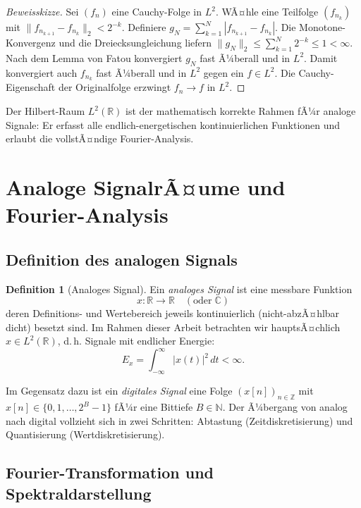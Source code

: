 ﻿\documentclass[a4paper,12pt]{article}
\theoremstyle{definition}
\newtheorem{definition}{Definition}
\begin{document}
\begin{proof}[Beweisskizze]
Sei $(f_n)$ eine Cauchy-Folge in $L^2$.  WÃ¤hle eine Teilfolge $(f_{n_k})$ mit
$\|f_{n_{k+1}} - f_{n_k}\|_2 < 2^{-k}$.  Definiere
$g_N = \sum_{k=1}^N |f_{n_{k+1}} - f_{n_k}|$.
Die Monotone-Konvergenz und die Dreiecksungleichung liefern
$\|g_N\|_2 \leq \sum_{k=1}^N 2^{-k} \leq 1 < \infty$.
Nach dem Lemma von Fatou konvergiert $g_N$ fast Ã¼berall und in $L^2$.
Damit konvergiert auch $f_{n_k}$ fast Ã¼berall und in $L^2$ gegen ein $f \in L^2$.
Die Cauchy-Eigenschaft der Originalfolge erzwingt $f_n \to f$ in $L^2$.
\end{proof}

Der Hilbert-Raum $L^2(\mathbb{R})$ ist der mathematisch korrekte Rahmen fÃ¼r
analoge Signale: Er erfasst alle endlich-energetischen kontinuierlichen Funktionen
und erlaubt die vollstÃ¤ndige Fourier-Analysis.

\section{Analoge SignalrÃ¤ume und Fourier-Analysis}
\label{sec:signale}

\subsection{Definition des analogen Signals}

\begin{definition}[Analoges Signal]
\label{def:analoges_signal}
Ein \emph{analoges Signal} ist eine messbare Funktion
\[
x: \mathbb{R} \to \mathbb{R} \quad (\text{oder} \; \mathbb{C})
\]
deren Definitions- und Wertebereich jeweils kontinuierlich (nicht-abzÃ¤hlbar dicht)
besetzt sind.  Im Rahmen dieser Arbeit betrachten wir hauptsÃ¤chlich
$x \in L^2(\mathbb{R})$, d.\,h. Signale mit endlicher Energie:
\[
E_x = \int_{-\infty}^{\infty} |x(t)|^2 \, dt < \infty.
\]
\end{definition}

Im Gegensatz dazu ist ein \emph{digitales Signal} eine Folge $(x[n])_{n \in \mathbb{Z}}$
mit $x[n] \in \{0,1,\ldots,2^B-1\}$ fÃ¼r eine Bittiefe $B \in \mathbb{N}$.
Der Ã¼bergang von analog nach digital vollzieht sich in zwei Schritten:
Abtastung (Zeitdiskretisierung) und Quantisierung (Wertdiskretisierung).

\subsection{Fourier-Transformation und Spektraldarstellung}
\end{document}
